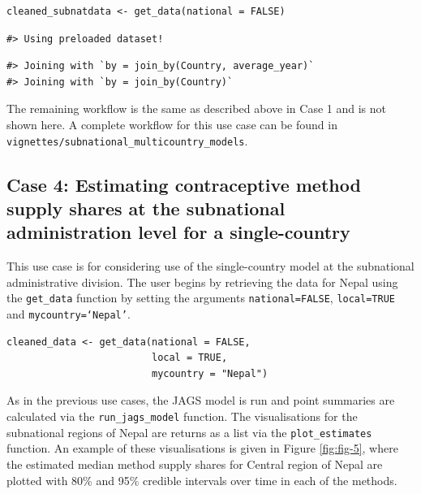 \begin{verbatim}
cleaned_subnatdata <- get_data(national = FALSE)
\end{verbatim}

\begin{verbatim}
#> Using preloaded dataset!
\end{verbatim}

\begin{verbatim}
#> Joining with `by = join_by(Country, average_year)`
#> Joining with `by = join_by(Country)`
\end{verbatim}

The remaining workflow is the same as described above in Case 1 and is not shown here. A complete workflow for this use case can be found in \texttt{vignettes/subnational\_multicountry\_models}.

\hypertarget{case-4-estimating-contraceptive-method-supply-shares-at-the-subnational-administration-level-for-a-single-country}{%
\subsection{Case 4: Estimating contraceptive method supply shares at the subnational administration level for a single-country}\label{case-4-estimating-contraceptive-method-supply-shares-at-the-subnational-administration-level-for-a-single-country}}

This use case is for considering use of the single-country model at the subnational administrative division. The user begins by retrieving the data for Nepal using the \texttt{get\_data} function by setting the arguments \texttt{national=FALSE}, \texttt{local=TRUE} and \texttt{mycountry=‘Nepal’}.

\begin{verbatim}
cleaned_data <- get_data(national = FALSE, 
                         local = TRUE,
                         mycountry = "Nepal")
\end{verbatim}

As in the previous use cases, the JAGS model is run and point summaries are calculated via the \texttt{run\_jags\_model} function. The visualisations for the subnational regions of Nepal are returns as a list via the \texttt{plot\_estimates} function. An example of these visualisations is given in Figure \ref{fig:fig-5}, where the estimated median method supply shares for Central region of Nepal are plotted with 80\% and 95\% credible intervals over time in each of the methods.



